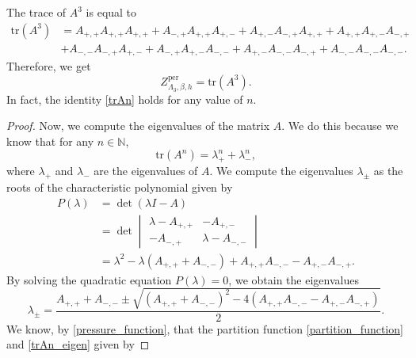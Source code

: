 \documentclass[11pt]{book}
\begin{document}
The trace of $A^3$ is equal to
\begin{align*}
\text{tr}(A^3) &= A_{+,+} A_{+,+} A_{+,+} + A_{-,+} A_{+,+} A_{+,-} + A_{+,-} A_{-,+} A_{+,+} + A_{+,+} A_{+,-} A_{-,+} \\
&+ A_{-,-} A_{-,+} A_{+,-} + A_{-,+} A_{+,-} A_{-,-} + A_{+,-} A_{-,-} A_{-,+} + A_{-,-} A_{-,-} A_{-,-}.
\end{align*}
Therefore, we get 
\begin{equation}\label{trA3}
Z^{\text{per}}_{\Lambda_3,\beta,h} = \text{tr}(A^3).
\end{equation}
In fact, the identity \eqref{trAn} holds for any value of $n$. 

\begin{proof}
Now, we compute the eigenvalues of the matrix $A$. We do this because we know that for any $n \in \mathbb{N}$, 
\begin{equation}\label{trAn_eigen}
\text{tr}(A^n) = \lambda_+^n + \lambda_-^n,
\end{equation}
where $\lambda_+$ and $\lambda_-$ are the eigenvalues of $A$. 
We compute the eigenvalues $\lambda_{\pm}$ as the roots of the characteristic polynomial given by
\begin{align*}
    P(\lambda) &= \det(\lambda I - A) \\
    &= \det 
\begin{vmatrix}
    \lambda - A_{+,+} & -A_{+,-} \\
    -A_{-,+} & \lambda - A_{-,-}
\end{vmatrix} \\
&= \lambda^2 - \lambda(A_{+,+} + A_{-,-}) + A_{+,+}A_{-,-} - A_{+,-}A_{-,+}.
\end{align*}
By solving the quadratic equation $P(\lambda)=0$, we obtain the eigenvalues
\begin{equation}\label{eigenvalues}
\lambda_{\pm} = \frac{A_{+,+} + A_{-,-} \pm \sqrt{(A_{+,+} + A_{-,-})^2 - 4(A_{+,+}A_{-,-} - A_{+,-}A_{-,+})}}{2}.
\end{equation}
We know, by \eqref{pressure_function}, that the partition function \eqref{partition_function} and \eqref{trAn_eigen} given by


\end{proof}
\end{document}
